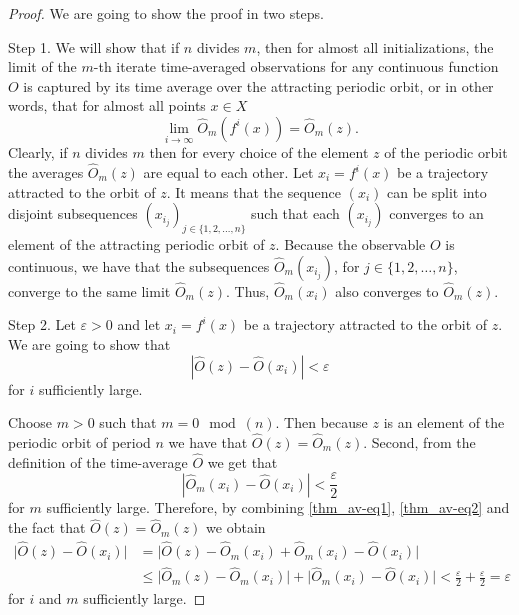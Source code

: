 \documentclass[10pt,a4paper]{amsart}
\def\R{\ensuremath{\mathbb{R}}}
\begin{document}
\begin{proof}
We are going to show the proof in two steps.

Step 1. We will show that if $n$ divides $m$, then for almost all initializations, the limit of the $m$-th iterate time-averaged observations for any continuous function $O$ is captured by its time average over the attracting periodic orbit, or in other words, that
for almost all points $x \in X$
\begin{equation}\label{thm_av-eq1}
\lim_{i \rightarrow \infty} \hat{O}_m(f^i(x)) =  \hat{O}_m(z).
\end{equation}
Clearly, if $n$ divides $m$ then for every choice of the element $z$
of the periodic orbit the averages $\hat{O}_m(z)$ are equal to each
other. Let $x_i = f^i(x)$ be a trajectory attracted to the orbit of
$z$. It means that the sequence $(x_i)$ can be split into disjoint
subsequences $(x_{i_j})_{j \in \{1,2,\ldots,n\}}$ such that each
$(x_{i_j})$ converges to an element of the attracting periodic orbit
of $z$. Because the observable $O$ is continuous, we have that the
subsequences $\hat{O}_m(x_{i_j})$, for $j \in \{1,2,\ldots,n\}$,
converge to the same limit $\hat{O}_m(z)$. 
Thus, $\hat{O}_m(x_{i})$ also converges to $\hat{O}_m(z)$.

Step 2. Let $\varepsilon > 0$ and let $x_i = f^i(x)$ be a trajectory attracted to the orbit of
$z$. We are going to show that
\[
 | \hat{O}(z) - \hat{O}(x_i) | < \varepsilon
\]
for $i$ sufficiently large.

Choose $m>0$ such that $m=0 \mod (n)$.  Then because $z$ is an element of the periodic orbit of period $n$ we have that $\hat{O}(z) = \hat{O}_m(z)$.
Second, from the definition of the time-average $\hat{O}$ we get that
\begin{equation}\label{thm_av-eq2}
 | \hat{O}_m (x_i) - \hat{O} (x_i) | < \frac{\varepsilon}{2}
\end{equation}
for $m$ sufficiently large. Therefore, by combining \eqref{thm_av-eq1}, \eqref{thm_av-eq2} and the fact that $\hat{O}(z) = \hat{O}_m(z)$ we obtain
\begin{align*}
 \big| \hat{O} (z) - \hat{O} (x_i) \big| &= \big| \hat{O} (z) - \hat{O}_m (x_i) + \hat{O}_m (x_i) - \hat{O} (x_i) \big| \\
 &\leqslant \big| \hat{O}_m (z) - \hat{O}_m (x_i) \big| +  \big| \hat{O}_m (x_i) - \hat{O} (x_i) \big| < \frac{\varepsilon}{2} + \frac{\varepsilon}{2} = \varepsilon
\end{align*}
for $i$ and $m$ sufficiently large.
\end{proof}
\end{document}

